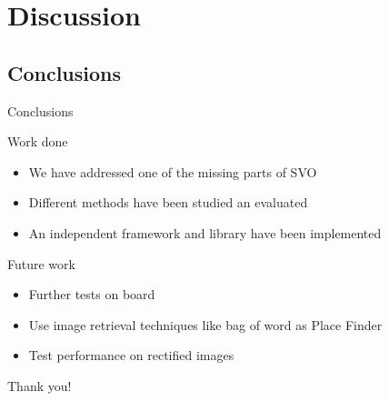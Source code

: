 
\section{Discussion}
\subsection{Conclusions}
\label{sub:conclusions}

\begin{frame}[t]{Conclusions}
  \begin{block}{Work done}

    \begin{itemize}
      \item We have addressed one of the missing parts of SVO
      \item Different methods have been studied an evaluated
      \item An independent framework and library have been implemented
    \end{itemize}

  \end{block}
  \begin{block}{Future work}
    \begin{itemize}
      \item Further tests on board
      \item Use image retrieval techniques like bag of word as Place Finder
      \item Test performance on rectified images
    \end{itemize}

  \end{block}

\end{frame}

\begin{frame}[t]{Thank you!}
  \vfill
  \vfill

\end{frame}
